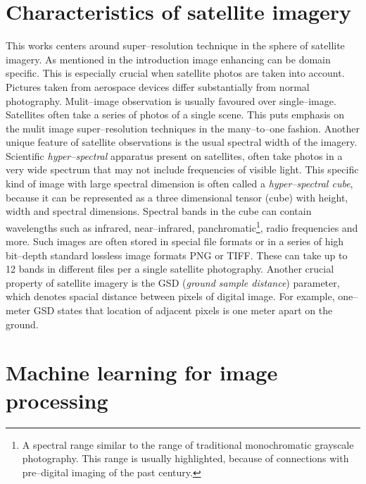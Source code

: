 \section{Characteristics of satellite imagery}
This works centers around super--resolution technique in the sphere of satellite imagery.
As mentioned in the introduction image enhancing can be domain specific.
This is especially crucial when satellite photos are taken into account.
Pictures taken from aerospace devices differ substantially from normal photography.
Mulit--image observation is usually favoured over single--image.
Satellites often take a series of photos of a single scene.
This puts emphasis on the mulit image super--resolution techniques in the many--to--one fashion.
Another unique feature of satellite observations is the usual spectral width of the imagery.
Scientific \textit{hyper--spectral} apparatus present on satellites, often take photos in a very wide spectrum that may not include frequencies of visible light.
This specific kind of image with large spectral dimension is often called a \textit{hyper--spectral cube}, because it can be represented as a three dimensional tensor (cube) with height, width and spectral dimensions.
Spectral bands in the cube can contain wavelengths such as infrared, near--infrared, panchromatic\footnote{A spectral range similar to the range of traditional monochromatic grayscale photography. This range is usually highlighted, because of connections with pre--digital imaging of the past century.}, radio frequencies and more.
Such images are often stored in special file formats or in a series of high bit--depth standard lossless image formats PNG or TIFF.
These can take up to 12 bands in different files per a single satellite photography.
Another crucial property of satellite imagery is the GSD (\textit{ground sample distance}) parameter, which denotes spacial distance between pixels of digital image.
For example, one--meter GSD states that location of adjacent pixels is one meter apart on the ground.

\section{Machine learning for image processing}
